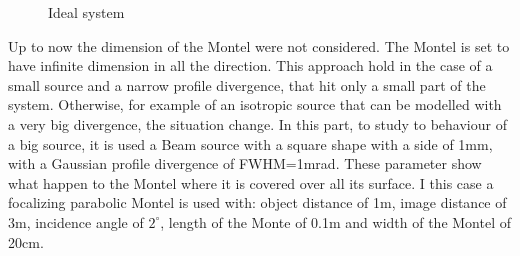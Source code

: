 \begin{figure}[]
%
\centering
%
%
\quad
%
%
%
\caption{Ideal system}
%
\label{fig: ideal}
%
\end{figure}
%
Up to now the dimension of the Montel were not considered. The Montel is set to have infinite dimension in all the direction. This approach hold in the case of a small source and a narrow profile divergence, that hit only a small part of the system. Otherwise, for example of an isotropic source that can be modelled with a very big divergence, the situation change. In this part, to study to behaviour of a big source, it is used a Beam source with a square shape with a side of 1mm, with a Gaussian profile divergence of FWHM=1mrad. These parameter show what happen to the Montel where it is covered over all its surface. I  this case a focalizing parabolic Montel is used with:  object  distance of 1m, image distance of 3m, incidence angle of $2^{\circ} $,  length of the Monte of 0.1m and width of the Montel of 20cm.
